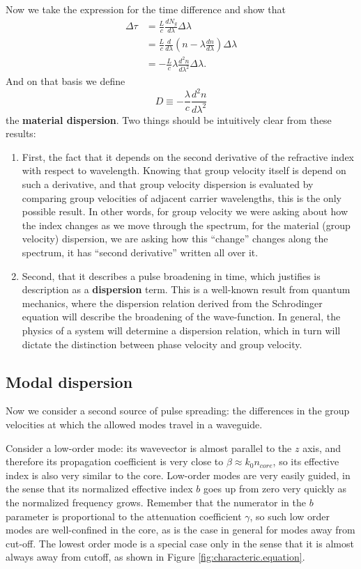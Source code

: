 Now we take the expression for the time difference and show that
\begin{align}
    \Delta\tau&=\frac{L}{c}\frac{dN_g}{d\lambda}\Delta\lambda\\
    &=\frac{L}{c}\frac{d}{d\lambda}\left(n-\lambda\frac{dn}{d\lambda}\right)\Delta\lambda\\
    &=-\frac{L}{c}\lambda\frac{d^2n}{d\lambda^2}\Delta\lambda.
\end{align}
And on that basis we define
\begin{equation}
    D\equiv-\frac{\lambda}{c}\frac{d^2n}{d\lambda^2}
\end{equation}
the \textbf{material dispersion}. Two things should be intuitively clear from these results:
\begin{enumerate}
    \item First, the fact that it depends on the second derivative of the refractive index with respect to wavelength. Knowing that group velocity itself is depend on such a derivative, and that group velocity dispersion is evaluated by comparing group velocities of adjacent carrier wavelengths, this is the only possible result. In other words, for group velocity we were asking about how the index changes as we move through the spectrum, for the material (group velocity) dispersion, we are asking how this ``change'' changes along the spectrum, it has ``second derivative'' written all over it.
    \item Second, that it describes a pulse broadening in time, which justifies is description as a \textbf{dispersion} term. This is a well-known result from quantum mechanics, where the dispersion relation derived from the Schrodinger equation will describe the broadening of the wave-function. In general, the physics of a system will determine a dispersion relation, which in turn will dictate the distinction between phase velocity and group velocity.
\end{enumerate}

\subsection{Modal dispersion}

Now we consider a second source of pulse spreading: the differences in the group velocities at which the allowed modes travel in a waveguide.

Consider a low-order mode: its wavevector is almost parallel to the $z$ axis, and therefore its propagation coefficient is very close to $\beta\approx k_0n_{core}$, so its effective index is also very similar to the core. Low-order modes are very easily guided, in the sense that its normalized effective index $b$ goes up from zero very quickly as the normalized frequency grows. Remember that the numerator in the $b$ parameter is proportional to the attenuation coefficient $\gamma$, so such low order modes are well-confined in the core, as is the case in general for modes away from cut-off. The lowest order mode is a special case only in the sense that it is almost always away from cutoff, as shown in Figure \ref{fig:characteric.equation}.

